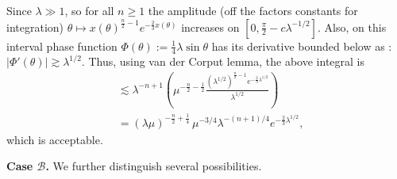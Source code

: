 \documentclass[11pt, reqno]{amsart}
\theoremstyle{plain}
\theoremstyle{remark}
\theoremstyle{example}
\theoremstyle{definition}
\numberwithin{equation}{section}
\begin{document}
Since $\lambda \gg 1$, so for all $n \geq 1$ the amplitude (off the factors constants for integration) $\theta \mapsto x(\theta)^{\frac{n}{2}-1} e^{-\frac{2}{3} x(\theta)}$ increases on $[0, \frac{\pi}{2}- c \lambda^{-1/2}]$. Also, on this interval phase function $\varPhi(\theta):= \frac{1}{4} \lambda \sin{\theta}$ has its derivative bounded below as : $|\varPhi'(\theta)| \gtrsim \lambda^{1/2} $.  Thus, using van der Corput lemma, the above integral is 
\begin{align}
    & \lesssim \lambda^{-n+1} \left( \mu^{-\frac{n}{2} - \frac{1}{2}} \frac{  \left( \lambda^{1/2} \right)^{\frac{n}{2}-1} e^{-\frac{2}{3} \lambda^{1/2}}         }{\lambda^{1/2}} \right) \label{Corput exponential}  \\
        & = (\lambda \mu)^{- \frac{n}{2}+ \frac{1}{4}} \, \mu^{-3/4} \lambda^{- (n+1)/4} e^{-\frac{2}{3} \lambda^{1/2}}, \nonumber
\end{align}
which is acceptable. 

\noindent \textbf{Case $\mathcal{B}$.} We further distinguish several possibilities. \medskip
\begin{center}
\end{center}
\medskip
\end{document}
